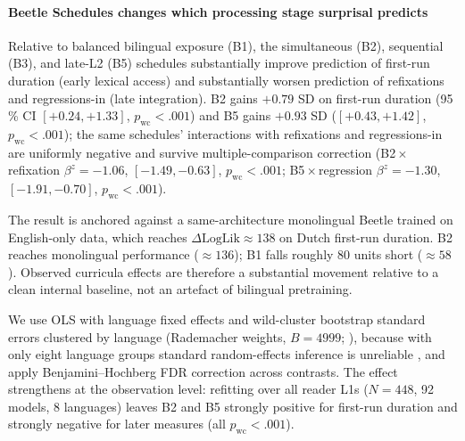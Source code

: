 \documentclass[11pt]{article}
\begin{document}
\paragraph{Beetle Schedules changes which processing stage surprisal predicts } Relative to balanced bilingual exposure (B1), the simultaneous (B2), sequential (B3), and late-L2 (B5) schedules substantially improve prediction of first-run duration (early lexical access) and substantially worsen prediction of refixations and regressions-in (late integration). B2 gains $+0.79$ SD on first-run duration (95\,\% CI $[+0.24, +1.33]$, $p_{\mathrm{wc}}{<}.001$) and B5 gains $+0.93$ SD ($[+0.43, +1.42]$, $p_{\mathrm{wc}}{<}.001$); the same schedules' interactions with refixations and regressions-in are uniformly negative and survive multiple-comparison correction (B2\,$\times$\,refixation $\beta^{z}{=}{-}1.06$, $[-1.49, -0.63]$, $p_{\mathrm{wc}}{<}.001$; B5\,$\times$\,regression $\beta^{z}{=}{-}1.30$, $[-1.91, -0.70]$,
$p_{\mathrm{wc}}{<}.001$).

The result is anchored against a same-architecture monolingual Beetle trained on English-only data, which reaches $\Delta\mathrm{LogLik}\!\approx\!138$ on Dutch first-run duration. B2 reaches monolingual performance ($\approx\!136$); B1 falls roughly
80 units short ($\approx\!58$). Observed curricula effects are therefore a substantial movement relative to a clean internal baseline, not an artefact of bilingual pretraining.

We use OLS with language fixed effects and wild-cluster bootstrap standard errors clustered by language (Rademacher weights, $B{=}4999$; \citealp{cameron2008bootstrap}), because with only eight language groups standard random-effects inference is unreliable
\citep{mcneish2017unnecessary}, and apply Benjamini--Hochberg FDR correction across contrasts. The effect strengthens at the observation level: refitting over all reader L1s ($N{=}448$, 92 models, 8 languages) leaves B2 and B5 strongly positive for first-run duration and strongly negative for later measures (all $p_{\mathrm{wc}}{<}.001$).
\end{document}

